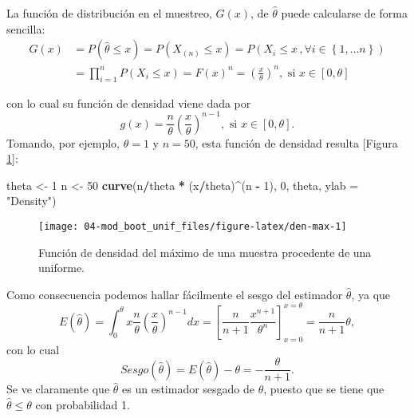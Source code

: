 \documentclass[
]{book}
\newenvironment{Shaded}{\begin{snugshade}}{\end{snugshade}}
\newcommand{\DataTypeTok}[1]{\textcolor[rgb]{0.13,0.29,0.53}{#1}}
\newcommand{\DecValTok}[1]{\textcolor[rgb]{0.00,0.00,0.81}{#1}}
\newcommand{\KeywordTok}[1]{\textcolor[rgb]{0.13,0.29,0.53}{\textbf{#1}}}
\newcommand{\NormalTok}[1]{#1}
\newcommand{\OperatorTok}[1]{\textcolor[rgb]{0.81,0.36,0.00}{\textbf{#1}}}
\newcommand{\StringTok}[1]{\textcolor[rgb]{0.31,0.60,0.02}{#1}}
\theoremstyle{definition}
\theoremstyle{definition}
\theoremstyle{definition}
\theoremstyle{remark}
\begin{document}
La función de distribución en el muestreo, \(G\left( x \right)\), de
\(\hat{\theta}\) puede calcularse de forma sencilla:\[\begin{aligned}
G\left( x \right) &= P\left( \hat{\theta}\leq x \right) =P\left( X_{\left(
n \right)}\leq x \right) =P\left( X_i\leq x\,,\forall i\in \left\{ 1,\ldots
n\right\} \right) \\
&= \prod_{i=1}^{n}P\left( X_i\leq x \right) =F\left( x \right)^{n}=\left( 
\frac{x}{\theta } \right)^{n},\text{ si }x\in \left[ 0,\theta \right]\end{aligned}\]

con lo cual su función de densidad viene dada por
\[g\left( x \right) =\frac{n}{\theta }\left( \frac{x}{\theta } \right)^{n-1},
\text{ si }x\in \left[ 0,\theta \right] .\]
Tomando, por ejemplo, \(\theta =1\) y \(n=50\), esta función de densidad resulta
{[}Figura \ref{fig:den-max}{]}:

\begin{Shaded}
\begin{Highlighting}[]
\NormalTok{theta <-}\StringTok{ }\DecValTok{1}
\NormalTok{n <-}\StringTok{ }\DecValTok{50}
\KeywordTok{curve}\NormalTok{(n}\OperatorTok{/}\NormalTok{theta }\OperatorTok{*}\StringTok{ }\NormalTok{(x}\OperatorTok{/}\NormalTok{theta)}\OperatorTok{^}\NormalTok{(n }\OperatorTok{-}\StringTok{ }\DecValTok{1}\NormalTok{), }\DecValTok{0}\NormalTok{, theta, }\DataTypeTok{ylab =} \StringTok{"Density"}\NormalTok{)}
\end{Highlighting}
\end{Shaded}

\begin{figure}[!htb]

{\centering \texttt{[image: 04-mod\_boot\_unif\_files/figure-latex/den-max-1]} 

}

\caption{Función de densidad del máximo de una muestra procedente de una uniforme.}\label{fig:den-max}
\end{figure}

Como consecuencia podemos hallar fácilmente el sesgo del estimador
\(\hat{\theta}\), ya que
\[E\left( \hat{\theta} \right) =\int_{0}^{\theta }x\frac{n}{\theta }\left( 
\frac{x}{\theta } \right)^{n-1}dx=\left[ \frac{n}{n+1}\frac{x^{n+1}}{\theta
^{n}}\right] _{x=0}^{x=\theta }=\frac{n}{n+1}\theta ,\]
con lo cual
\[Sesgo\left( \hat{\theta} \right) =E\left( \hat{\theta} \right)
-\theta = -\frac{\theta }{n+1}.\]
Se ve claramente que \(\hat{\theta}\)
es un estimador sesgado de \(\theta\), puesto que se tiene que
\(\hat{\theta}\leq \theta\) con probabilidad 1.
\end{document}
